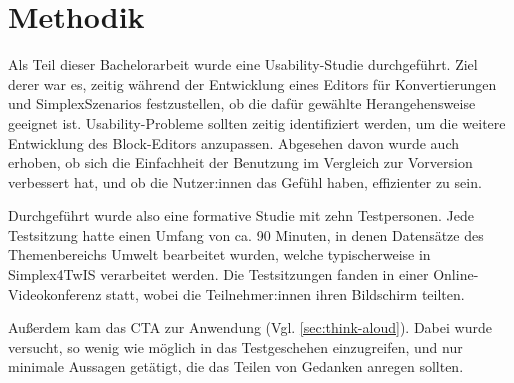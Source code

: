 \section{Methodik}

Als Teil dieser Bachelorarbeit wurde eine Usability-Studie durchgeführt. Ziel derer war es, zeitig während der Entwicklung eines Editors für Konvertierungen und SimplexSzenarios festzustellen, ob die dafür gewählte Herangehensweise geeignet ist. Usability-Probleme sollten zeitig identifiziert werden, um die weitere Entwicklung des Block-Editors anzupassen. Abgesehen davon wurde auch erhoben, ob sich die Einfachheit der Benutzung im Vergleich zur Vorversion verbessert hat, und ob die Nutzer:innen das Gefühl haben, effizienter zu sein.

Durchgeführt wurde also eine formative Studie mit zehn Testpersonen. Jede Testsitzung hatte einen Umfang von ca. 90 Minuten, in denen Datensätze des Themenbereichs Umwelt bearbeitet wurden, welche typischerweise in Simplex4TwIS verarbeitet werden. Die Testsitzungen fanden in einer Online-Videokonferenz statt, wobei die Teilnehmer:innen ihren Bildschirm teilten.

Außerdem kam das \acf{CTA} zur Anwendung (Vgl. \ref{sec:think-aloud}). Dabei wurde versucht, so wenig wie möglich in das Testgeschehen einzugreifen, und nur minimale Aussagen getätigt, die das Teilen von Gedanken anregen sollten.
